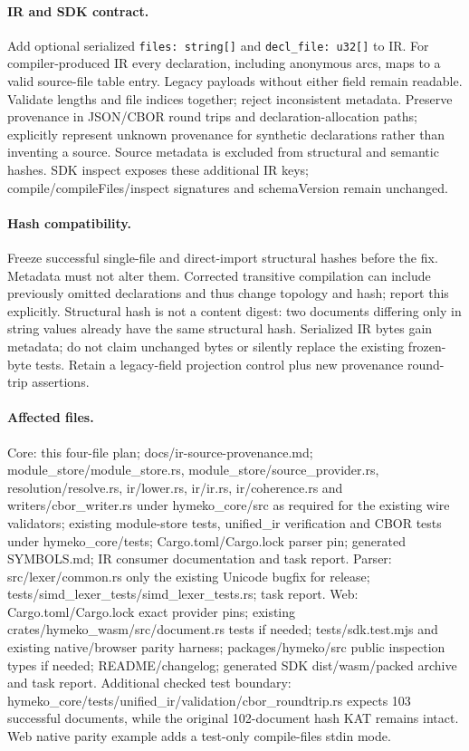 \documentclass[11pt,a4paper]{article}
\begin{document}
\paragraph{IR and SDK contract.} Add optional serialized \texttt{files: string[]}
and \texttt{decl\_file: u32[]} to IR. For compiler-produced IR every declaration,
including anonymous arcs, maps to a valid source-file table entry. Legacy payloads
without either field remain readable. Validate lengths and file indices together;
reject inconsistent metadata. Preserve provenance in JSON/CBOR round trips and
declaration-allocation paths; explicitly represent unknown provenance for synthetic
declarations rather than inventing a source. Source metadata is excluded from
structural and semantic hashes. SDK inspect exposes these additional IR keys;
compile/compileFiles/inspect signatures and schemaVersion remain unchanged.
\paragraph{Hash compatibility.} Freeze successful single-file and direct-import
structural hashes before the fix. Metadata must not alter them. Corrected transitive
compilation can include previously omitted declarations and thus change topology
and hash; report this explicitly. Structural hash is not a content digest: two
documents differing only in string values already have the same structural hash.
Serialized IR bytes gain metadata; do not claim unchanged bytes or silently replace
the existing frozen-byte tests. Retain a legacy-field projection control plus new
provenance round-trip assertions.
\paragraph{Affected files.} Core: this four-file plan; docs/ir-source-provenance.md;
module\_store/module\_store.rs,
module\_store/source\_provider.rs, resolution/resolve.rs, ir/lower.rs, ir/ir.rs,
ir/coherence.rs and writers/cbor\_writer.rs under hymeko\_core/src as required for
the existing wire validators; existing module-store tests, unified\_ir verification
and CBOR tests under hymeko\_core/tests; Cargo.toml/Cargo.lock parser pin; generated
SYMBOLS.md; IR consumer documentation and task report. Parser: src/lexer/common.rs
only the existing Unicode bugfix for release; tests/simd\_lexer\_tests/simd\_lexer\_tests.rs;
task report. Web: Cargo.toml/Cargo.lock exact provider pins; existing
crates/hymeko\_wasm/src/document.rs tests if needed; tests/sdk.test.mjs and existing
native/browser parity harness; packages/hymeko/src public inspection types if
needed; README/changelog; generated SDK dist/wasm/packed archive and task report.
Additional checked test boundary: hymeko\_core/tests/unified\_ir/validation/cbor\_roundtrip.rs
expects 103 successful documents, while the original 102-document hash KAT remains
intact. Web native parity example adds a test-only compile-files stdin mode.
\end{document}
